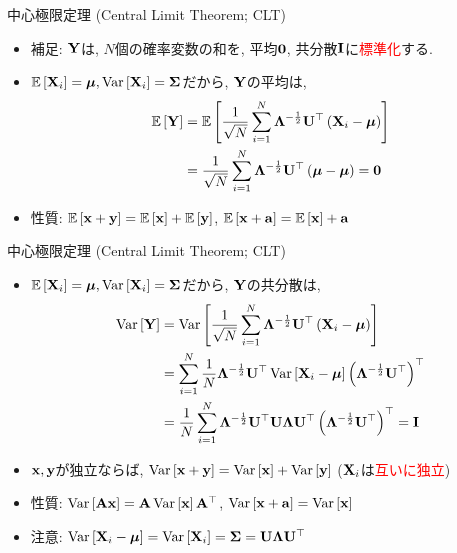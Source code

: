 \documentclass[dvipdfmx,notheorems,t]{beamer}
\begin{document}
\begin{frame}{中心極限定理 (Central Limit Theorem; CLT)}
\begin{itemize}
  \item 補足: $\vb{Y}$は, $N$個の確率変数の和を, 平均$\vb{0}$, 共分散$\vb{I}$に\textcolor{red}{標準化}する.
  \item $\operatorname{\mathbb{E}} \left[ \vb{X}_i \right] = \vb*{\mu}, \operatorname{Var} \left[ \vb{X}_i \right] = \vb{\Sigma}$だから, $\vb{Y}$の平均は,
  \begin{align*}
    \operatorname{\mathbb{E}} \left[ \vb{Y} \right] &= \operatorname{\mathbb{E}} \left[ \frac{1}{\sqrt{N}} \sum_{i = 1}^N \vb{\Lambda}^{-\frac{1}{2}} \vb{U}^\top
      \left( \vb{X}_i - \vb*{\mu} \right) \right] \\
      &= \frac{1}{\sqrt{N}} \sum_{i = 1}^N \vb{\Lambda}^{-\frac{1}{2}} \vb{U}^\top
        \left( \vb*{\mu} - \vb*{\mu} \right) = \vb{0}
  \end{align*}
  \item 性質: $\operatorname{\mathbb{E}} \left[ \vb{x} + \vb{y} \right] = \operatorname{\mathbb{E}} \left[ \vb{x} \right] + \operatorname{\mathbb{E}} \left[ \vb{y} \right]$,
    $\operatorname{\mathbb{E}} \left[ \vb{x} + \vb{a} \right] = \operatorname{\mathbb{E}} \left[ \vb{x} \right] + \vb{a}$
\end{itemize}
\end{frame}

\begin{frame}{中心極限定理 (Central Limit Theorem; CLT)}
\begin{itemize}
  \item $\operatorname{\mathbb{E}} \left[ \vb{X}_i \right] = \vb*{\mu}, \operatorname{Var} \left[ \vb{X}_i \right] = \vb{\Sigma}$だから, $\vb{Y}$の共分散は,
  \begin{align*}
    \operatorname{Var} \left[ \vb{Y} \right] &= \operatorname{Var} \left[ \frac{1}{\sqrt{N}} \sum_{i = 1}^N \vb{\Lambda}^{-\frac{1}{2}} \vb{U}^\top
      \left( \vb{X}_i - \vb*{\mu} \right) \right] \\
      &= \sum_{i = 1}^N \frac{1}{N} \vb{\Lambda}^{-\frac{1}{2}} \vb{U}^\top
        \operatorname{Var} \left[ \vb{X}_i - \vb*{\mu} \right] \left( \vb{\Lambda}^{-\frac{1}{2}} \vb{U}^\top \right)^\top \\
      &= \frac{1}{N} \sum_{i = 1}^N \vb{\Lambda}^{-\frac{1}{2}} \vb{U}^\top
        \vb{U} \vb{\Lambda} \vb{U}^\top \left( \vb{\Lambda}^{-\frac{1}{2}} \vb{U}^\top \right)^\top
      = \vb{I}
  \end{align*}
  \item $\vb{x}, \vb{y}$が独立ならば, $\operatorname{Var} \left[ \vb{x} + \vb{y} \right] = \operatorname{Var} \left[ \vb{x} \right] + \operatorname{Var} \left[ \vb{y} \right]$
    ($\vb{X}_i$は\textcolor{red}{互いに独立})
  \item 性質: $\operatorname{Var} \left[ \vb{A} \vb{x} \right] = \vb{A} \operatorname{Var} \left[ \vb{x} \right] \vb{A}^\top$,
    $\operatorname{Var} \left[ \vb{x} + \vb{a} \right] = \operatorname{Var} \left[ \vb{x} \right]$
  \item 注意: $\operatorname{Var} \left[ \vb{X}_i - \vb*{\mu} \right] = \operatorname{Var} \left[ \vb{X}_i \right] = \vb{\Sigma} = \vb{U} \vb{\Lambda} \vb{U}^\top$
\end{itemize}
\end{frame}
\end{document}
